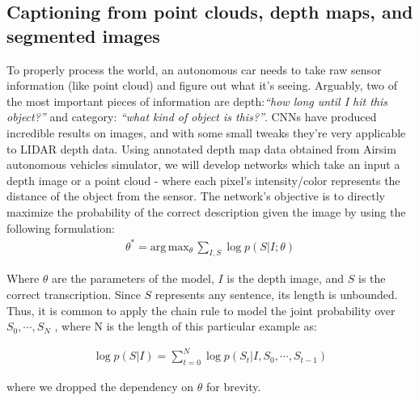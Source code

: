 \subsection{Captioning from point clouds, depth maps, and segmented images}
\label{subsec:point_cloud}

To properly process the world, an autonomous car needs to take raw sensor information (like point cloud) and figure out what it’s seeing.
Arguably, two of the most important pieces of information are depth:\textit{``how long until I hit this object?''} and category: \textit{``what kind of object is this?''}.
CNNs have produced incredible results on images, and with some small tweaks they’re very applicable to LIDAR depth data.
Using annotated depth map data obtained from Airsim autonomous vehicles simulator, we will develop networks which take an input a depth image or a point cloud - where each pixel's intensity/color represents the distance of the object from the sensor. 
The network's objective is to directly maximize the probability of the correct description given the image by using the following
formulation:
\begin{align}
     \theta^* = \text{arg} \, \text{max}_{\theta} \, \sum_{I,S} \log p(S|I;\theta)
\end{align}

Where $\theta$ are the parameters of the model, $I$ is the depth image, and $S$ is the correct transcription.  Since $S$ represents any sentence, its length is unbounded. Thus, it is common to apply the chain rule to model the joint probability over $S_0, \cdots, S_N$ , where N is the length of this particular example as:

\begin{align}
     \log p(S|I) = \sum_{t=0}^{N} \log p(S_t|I, S_0, \cdots, S_{t-1})
     \label{eq:joint}
\end{align}

where we dropped the dependency on $\theta$ for brevity.

